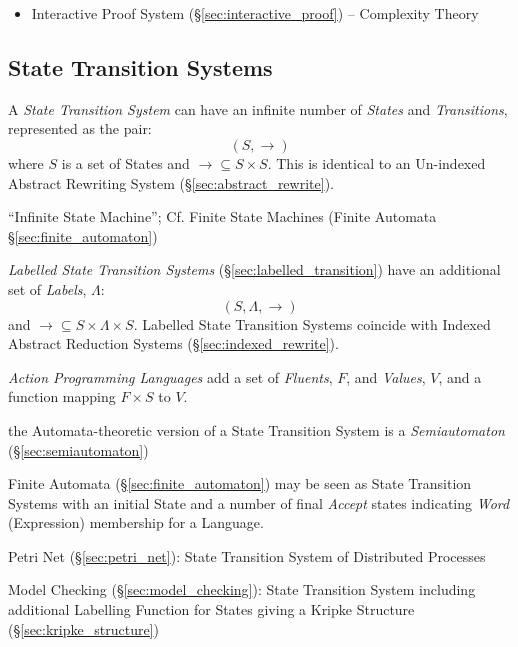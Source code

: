 \begin{itemize}
  \item Interactive Proof System (\S\ref{sec:interactive_proof}) -- Complexity
    Theory
\end{itemize}



\subsection{State Transition Systems}\label{sec:state_transition}

A \emph{State Transition System} can have an infinite number of
\emph{States} and \emph{Transitions}, represented as the pair:
\[
  (S,\rightarrow)
\]
where $S$ is a set of States and $\rightarrow \subseteq S \times S$.
This is identical to an Un-indexed Abstract Rewriting System
(\S\ref{sec:abstract_rewrite}).

``Infinite State Machine''; \fist Cf. Finite State Machines (Finite
Automata \S\ref{sec:finite_automaton})

\emph{Labelled State Transition Systems}
(\S\ref{sec:labelled_transition}) have an additional set of
\emph{Labels}, $\Lambda$:
\[
  (S,\Lambda,\rightarrow)
\]
and $\rightarrow \subseteq S \times \Lambda \times S$. Labelled State
Transition Systems coincide with Indexed Abstract Reduction Systems
(\S\ref{sec:indexed_rewrite}).

\emph{Action Programming Languages} add a set of \emph{Fluents}, $F$, and
\emph{Values}, $V$, and a function mapping $F \times S$ to $V$.

the Automata-theoretic version of a State Transition System is a
\emph{Semiautomaton} (\S\ref{sec:semiautomaton})

Finite Automata (\S\ref{sec:finite_automaton}) may be seen as State
Transition Systems with an initial State and a number of final
\emph{Accept} states indicating \emph{Word} (Expression) membership
for a Language.

Petri Net (\S\ref{sec:petri_net}): State Transition System of
Distributed Processes

Model Checking (\S\ref{sec:model_checking}): State Transition System
including additional Labelling Function for States giving a Kripke
Structure (\S\ref{sec:kripke_structure})


\asterism


